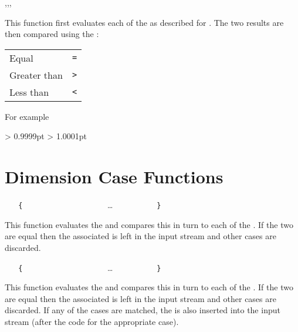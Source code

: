 \documentclass[oneside]{book}
\begin{document}
\begin{function}{\dimCompare,\dimCompareT,\dimCompareF,\dimCompareTF}
\begin{syntax}
   
    
    
     
\end{syntax}
This function first evaluates each of the 
as described for . The two results are then
compared using the :\par
{\centering
\begin{tabular}{ll}
Equal        & \verb|=| \\
Greater than & \verb|>| \\
Less than    & \verb|<| \\
\end{tabular}\par}
For example
\begin{demohigh}
\dimCompareTF {1pt} > {0.9999pt} {} {}
\dimCompareTF {1pt} > {1.0001pt} {} {}
\end{demohigh}
\end{function}

\section{Dimension Case Functions}

\begin{function}{\dimCase}
\begin{syntax}
 
~ ~ \verb|{|
~ ~ ~ ~  
~ ~ ~ ~   
~ ~ ~ ~ \ldots
~ ~ ~ ~  
~ ~ \verb|}|
\end{syntax}
This function evaluates the  and
compares this in turn to each of the
. If the two are equal then the
associated  is left in the input stream
and other cases are discarded.
\end{function}

\begin{function}{\dimCaseT}
\begin{syntax}
 
~ ~ \verb|{|
~ ~ ~ ~  
~ ~ ~ ~   
~ ~ ~ ~ \ldots
~ ~ ~ ~  
~ ~ \verb|}|
~ ~ 
\end{syntax}
This function evaluates the  and
compares this in turn to each of the
. If the two are equal then the
associated  is left in the input stream
and other cases are discarded. If any of the
cases are matched, the  is also inserted into the
input stream (after the code for the appropriate case).
\end{function}
\end{document}
